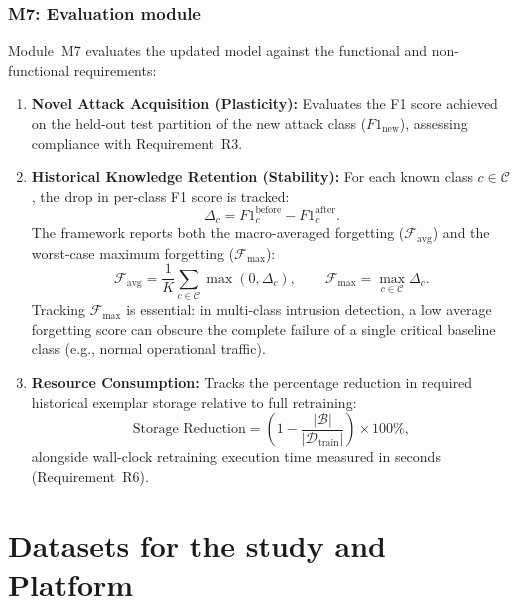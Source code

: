 \subsubsection{M7: Evaluation module}
\label{subsubsec:m7_evaluation_module}
Module~M7 evaluates the updated model against the functional and non-functional requirements:
\begin{enumerate}
    \item \textbf{Novel Attack Acquisition (Plasticity):} Evaluates the F1 score achieved on the held-out test partition of the new attack class ($F1_{\text{new}}$), assessing compliance with Requirement~R3.
    \item \textbf{Historical Knowledge Retention (Stability):} For each known class $c \in \mathcal{C}$, the drop in per-class F1 score is tracked:
    \begin{equation}
    \Delta_c = F1_c^{\text{before}} - F1_c^{\text{after}}.
    \label{eq:delta_c}
    \end{equation}
    The framework reports both the macro-averaged forgetting ($\mathcal{F}_{\text{avg}}$) and the worst-case maximum forgetting ($\mathcal{F}_{\max}$):
    \begin{equation}
    \mathcal{F}_{\text{avg}} = \frac{1}{K} \sum_{c \in \mathcal{C}} \max(0, \Delta_c), \qquad \mathcal{F}_{\max} = \max_{c \in \mathcal{C}} \Delta_c.
    \label{eq:forgetting_metrics}
    \end{equation}
    Tracking $\mathcal{F}_{\max}$ is essential: in multi-class intrusion detection, a low average forgetting score can obscure the complete failure of a single critical baseline class (e.g., normal operational traffic).
    \item \textbf{Resource Consumption:} Tracks the percentage reduction in required historical exemplar storage relative to full retraining:
    \begin{equation}
    \text{Storage Reduction} = \left( 1 - \frac{|\mathcal{B}|}{|\mathcal{D}_{\text{train}}|} \right) \times 100\%,
    \label{eq:storage_reduction}
    \end{equation}
    alongside wall-clock retraining execution time measured in seconds (Requirement~R6).
\end{enumerate}

\section{Datasets for the study and Platform}
\label{sec:datasets_platform}

